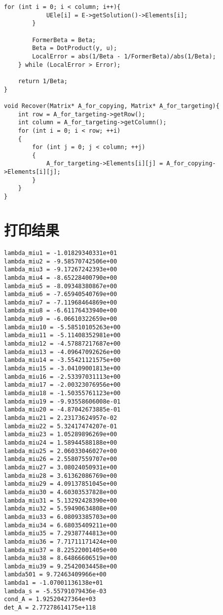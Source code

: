 \documentclass{ctexart}
\begin{document}
\begin{spacing}{1.4}
\begin{lstlisting}[language={[ANSI]C++}]
		for (int i = 0; i < column; i++){
			UEle[i] = E->getSolution()->Elements[i];
		}

		FormerBeta = Beta;
		Beta = DotProduct(y, u);
		LocalError = abs(1/Beta - 1/FormerBeta)/abs(1/Beta);
	} while (LocalError > Error);

	return 1/Beta;
}

void Recover(Matrix* A_for_copying, Matrix* A_for_targeting){
	int row = A_for_targeting->getRow();
	int column = A_for_targeting->getColumn();
	for (int i = 0; i < row; ++i)
	{
		for (int j = 0; j < column; ++j)
		{
			A_for_targeting->Elements[i][j] = A_for_copying->Elements[i][j];
		}
	}
}
\end{lstlisting}

\section{打印结果}
\begin{lstlisting}[language={[ANSI]C}]
lambda_miu1 = -1.01829340331e+01
lambda_miu2 = -9.58570742506e+00
lambda_miu3 = -9.17267242393e+00
lambda_miu4 = -8.65228400790e+00
lambda_miu5 = -8.09348380867e+00
lambda_miu6 = -7.65940540769e+00
lambda_miu7 = -7.11968464869e+00
lambda_miu8 = -6.61176433940e+00
lambda_miu9 = -6.06610322659e+00
lambda_miu10 = -5.58510105263e+00
lambda_miu11 = -5.11408352981e+00
lambda_miu12 = -4.57887217687e+00
lambda_miu13 = -4.09647092626e+00
lambda_miu14 = -3.55421121575e+00
lambda_miu15 = -3.04109001813e+00
lambda_miu16 = -2.53397031113e+00
lambda_miu17 = -2.00323076956e+00
lambda_miu18 = -1.50355761123e+00
lambda_miu19 = -9.93558606008e-01
lambda_miu20 = -4.87042673885e-01
lambda_miu21 = 2.23173624957e-02
lambda_miu22 = 5.32417474207e-01
lambda_miu23 = 1.05289896269e+00
lambda_miu24 = 1.58944588188e+00
lambda_miu25 = 2.06033046027e+00
lambda_miu26 = 2.55807559707e+00
lambda_miu27 = 3.08024050931e+00
lambda_miu28 = 3.61362086769e+00
lambda_miu29 = 4.09137851045e+00
lambda_miu30 = 4.60303537828e+00
lambda_miu31 = 5.13292428390e+00
lambda_miu32 = 5.59490634808e+00
lambda_miu33 = 6.08093385703e+00
lambda_miu34 = 6.68035409211e+00
lambda_miu35 = 7.29387744813e+00
lambda_miu36 = 7.71711171424e+00
lambda_miu37 = 8.22522001405e+00
lambda_miu38 = 8.64866606519e+00
lambda_miu39 = 9.25420034458e+00
lambda501 = 9.72463409966e+00
lambda1 = -1.07001136138e+01
lambda_s = -5.55791079436e-03
cond_A = 1.92520427364e+03
det_A = 2.77278614175e+118
\end{lstlisting}
\end{spacing}
\end{document}
